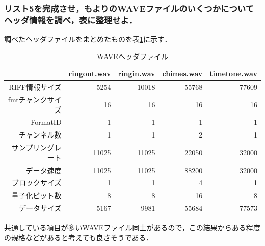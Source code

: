 \documentclass[titlepage]{jarticle}
\begin{document}
\subsubsection{リスト5を完成させ，もよりのWAVEファイルのいくつかについてヘッダ情報を調べ，表に整理せよ．}
調べたヘッダファイルをまとめたものを表\ref{wave_header}に示す．
\begin{table}[H]
  \caption{WAVEヘッダファイル}
  \label{wave_header}
  \centering
  \begin{tabular}{r|rrrr}\hline
               & ringout.wav & ringin.wav & chimes.wav & timetone.wav \\\hline\hline
    RIFF情報サイズ  & 5254        & 10018      & 55768      & 77609        \\
    fmtチャンクサイズ & 16          & 16         & 16         & 16           \\
    FormatID   & 1           & 1          & 1          & 1            \\
    チャンネル数     & 1           & 1          & 2          & 1            \\
    サンプリングレート  & 11025       & 11025      & 22050      & 32000        \\
    データ速度      & 11025       & 11025      & 88200      & 32000        \\
    ブロックサイズ    & 1           & 1          & 4          & 1            \\
    量子化ビット数    & 8           & 8          & 16         & 8            \\
    データサイズ     & 5167        & 9981       & 55684      & 77573        \\\hline
  \end{tabular}
\end{table}

共通している項目が多いWAVEファイル同士があるので，この結果からある程度の規格などがあると考えても良さそうである．
\end{document}
